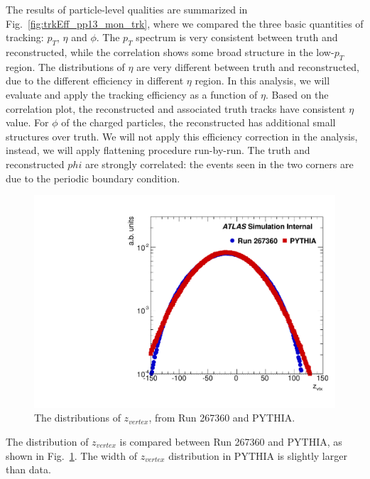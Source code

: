 The results of particle-level qualities are summarized in Fig.~\ref{fig:trkEff_pp13_mon_trk}, where we compared the three basic quantities of tracking: $p_{T}$, $\eta$ and $\phi$. The $p_{T}$ spectrum is very consistent between truth and reconstructed, while the correlation shows some broad structure in the low-$p_{T}$ region. The distributions of $\eta$ are very different between truth and reconstructed, due to the different efficiency in different $\eta$ region. In this analysis, we will evaluate and apply the tracking efficiency as a function of $\eta$. Based on the correlation plot, the reconstructed and associated truth tracks have consistent $\eta$ value.  For $\phi$ of the charged particles, the reconstructed has additional small structures over truth. We will not apply this efficiency correction in the analysis, instead, we will apply flattening procedure run-by-run. The truth and reconstructed $phi$ are strongly correlated: the events seen in the two corners are due to the periodic boundary condition.

\begin{figure}[H]
\centering
\includegraphics[width=.4\linewidth]{figs/sec_evtSlc/zVtx_MC_data.pdf}
\caption{The distributions of $z_{vertex}$, from Run 267360 and PYTHIA.}
\label{fig:zVtx_MC_data}
\end{figure}
The distribution of $z_{vertex}$ is compared between Run 267360 and PYTHIA, as shown in Fig.~\ref{fig:zVtx_MC_data}. The width of $z_{vertex}$ distribution in PYTHIA is slightly larger than data.

